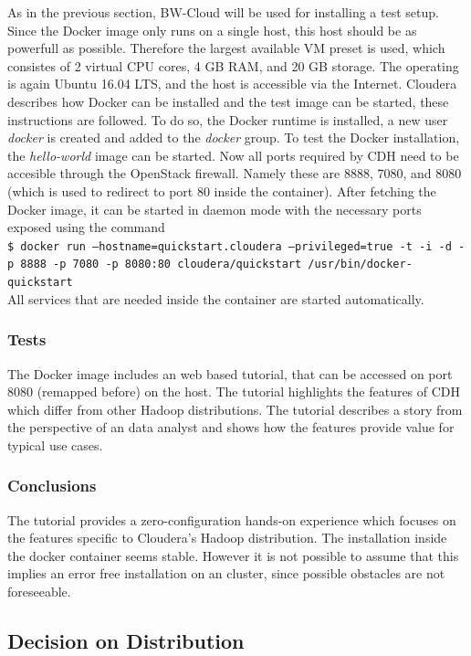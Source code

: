 As in the previous section, BW-Cloud will be used for installing a test setup.
Since the Docker image only runs on a single host, this host should be as powerfull as possible.
Therefore the largest available \ac{VM} preset is used, which consistes of 2 virtual \ac{CPU} cores, 
4 \ac{GB} \ac{RAM}, and 20 \ac{GB} storage. The operating is again Ubuntu 16.04 \ac{LTS}, 
and the host is accessible via the Internet. 
Cloudera describes how Docker can be installed and the test image can be started, 
these instructions are followed. \autocite[][]{cloudera2018docker}
To do so, the Docker runtime is installed, a new  user \emph{docker} is created and added to the \emph{docker} group. To test the Docker installation, the \emph{hello-world} image can be started.
Now all ports required by \ac{CDH} need to be accesible through the OpenStack firewall.
Namely these are 8888, 7080, and 8080 (which is used to redirect to port 80 inside the container).
After fetching the Docker  image, it can be started in daemon mode with the necessary ports exposed using the command\\
\texttt{\$ docker run --hostname=quickstart.cloudera --privileged=true -t -i -d -p 8888 -p 7080 -p 8080:80 cloudera/quickstart /usr/bin/docker-quickstart}\\
All services that are needed inside the container are started automatically.


\subsubsection{Tests}
The Docker image includes an web based tutorial, 
that can be accessed on port 8080 (remapped before) on the host.
The tutorial highlights the features of \ac{CDH} which differ from other Hadoop distributions.
The tutorial describes a story from the perspective of an data analyst and shows how the features provide value for typical use cases.

\subsubsection{Conclusions}
The tutorial provides a zero-configuration hands-on experience which focuses on the features specific to Cloudera's Hadoop distribution.
The installation inside the docker container seems stable.
However it is not possible to assume that this implies an error free installation on an cluster, 
since possible obstacles are not foreseeable.

\subsection{Decision on Distribution}

